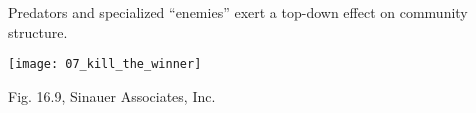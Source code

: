 \documentclass[t,handout]{beamer}  %
\begin{document}
%
\begin{frame}[t]{Predators and specialized ``enemies'' exert a top-down effect on community structure.}

	\vspace*{-0.5\baselineskip}
	\begin{center}
		\texttt{[image: 07\_kill\_the\_winner]}
	\end{center}
	\vfilll
	
	\hfill \tiny Fig. 16.9, \textcopyright Sinauer Associates, Inc.
\end{frame}

%
\end{document}
